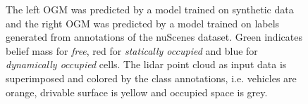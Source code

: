 \documentclass[conference]{IEEEtran}
\begin{document}
\begin{figure}
\centering
{}
\caption{The left OGM was predicted by a model trained on synthetic data and the right OGM was predicted by a model trained on labels generated from annotations of the nuScenes \cite{Caesar.2020} dataset. Green indicates belief mass for \textit{free}, red for \textit{statically occupied} and blue for \textit{dynamically occupied} cells. The lidar point cloud as input data is superimposed and colored by the class annotations, i.e. vehicles are orange, drivable surface is yellow and occupied space is grey.}
\label{fig:predictions}
\end{figure}
\end{document}
